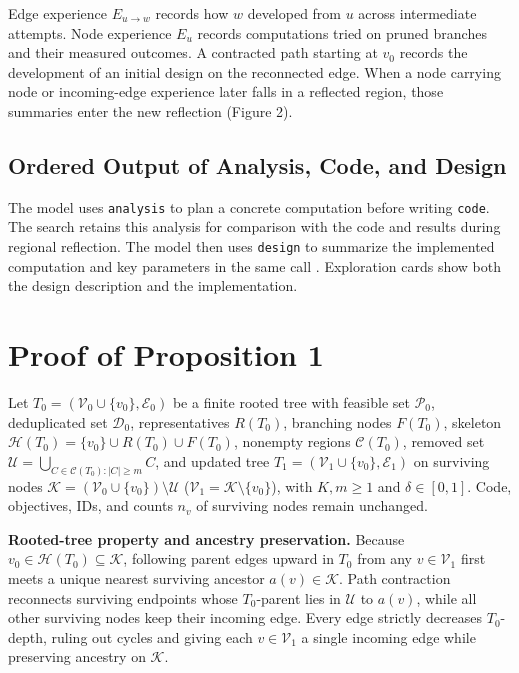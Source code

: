 \documentclass{article}
\begin{document}
Edge experience \(E_{u\to w}\) records how \(w\) developed from \(u\) across intermediate attempts. Node experience \(E_u\) records computations tried on pruned branches and their measured outcomes. A contracted path starting at \(v_0\) records the development of an initial design on the reconnected edge. When a node carrying node or incoming-edge experience later falls in a reflected region, those summaries enter the new reflection (Figure 2).

\subsection{Ordered Output of Analysis, Code, and Design}\label{ordered-output-of-analysis-code-and-design}

The model uses \texttt{analysis} to plan a concrete computation before writing \texttt{code}. The search retains this analysis for comparison with the code and results during regional reflection. The model then uses \texttt{design} to summarize the implemented computation and key parameters in the same call \citep{mctsahd}. Exploration cards show both the design description and the implementation.

\section{Proof of Proposition 1}\label{proof-of-proposition-1}

Let \(T_0=(\mathcal V_0\cup\{v_0\},\mathcal E_0)\) be a finite rooted tree with feasible set \(\mathcal P_0\), deduplicated set \(\mathcal D_0\), representatives \(R(T_0)\), branching nodes \(F(T_0)\), skeleton \(\mathcal H(T_0)=\{v_0\}\cup R(T_0)\cup F(T_0)\), nonempty regions \(\mathcal C(T_0)\), removed set \(\mathcal U=\bigcup_{C\in\mathcal C(T_0):|C|\geq m}C\), and updated tree \(T_1=(\mathcal V_1\cup\{v_0\},\mathcal E_1)\) on surviving nodes \(\mathcal K=(\mathcal V_0\cup\{v_0\})\setminus\mathcal U\) (\(\mathcal V_1=\mathcal K\setminus\{v_0\}\)), with \(K,m\geq 1\) and \(\delta\in[0,1]\). Code, objectives, IDs, and counts \(n_v\) of surviving nodes remain unchanged.

\textbf{Rooted-tree property and ancestry preservation.} Because \(v_0\in\mathcal H(T_0)\subseteq\mathcal K\), following parent edges upward in \(T_0\) from any \(v\in\mathcal V_1\) first meets a unique nearest surviving ancestor \(a(v)\in\mathcal K\). Path contraction reconnects surviving endpoints whose \(T_0\)-parent lies in \(\mathcal U\) to \(a(v)\), while all other surviving nodes keep their incoming edge. Every edge strictly decreases \(T_0\)-depth, ruling out cycles and giving each \(v\in\mathcal V_1\) a single incoming edge while preserving ancestry on \(\mathcal K\).
\end{document}
